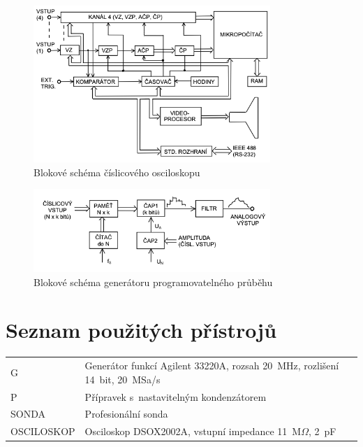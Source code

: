 \documentclass[a4paper,12pt]{article}   %
\newcommand{\tohm}{$\Omega$}
\begin{document}
\begin{figure}[h!]
  \centering
  \includegraphics[width = 0.8\textwidth]{blokove_schema_osciloskop.png}
  \caption{Blokové schéma číslicového osciloskopu}
  \label{fig:blok_osc}
\end{figure}

\begin{figure}[h!]
  \centering
  \includegraphics[width = 0.8\textwidth]{blokove_schema_generator.png}
  \caption{Blokové schéma generátoru programovatelného průběhu}
  \label{fig:blok_generator}
\end{figure}


\section{Seznam použitých přístrojů}
\label{chap:seznam_pristroju}
\begin{table}[H]
  \centering
  \begin{tabular}{ll}
    G&Generátor funkcí Agilent 33220A, rozsah 20~MHz, rozlišení 14~bit, 20~MSa/s\\
    P&Přípravek s~nastavitelným kondenzátorem\\
    SONDA&Profesionální sonda\\
    OSCILOSKOP&Osciloskop DSOX2002A, vstupní impedance 11~M\tohm , 2~pF
  \end{tabular}
\end{table}
\end{document}
